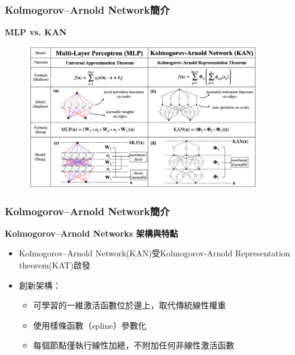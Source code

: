 \documentclass{beamer}
\begin{document}
\begin{frame}
    \frametitle{Kolmogorov–Arnold Network簡介}
    \centering
    \textbf{MLP vs. KAN}\\
    \begin{figure}               %
    \centering                 %
    \includegraphics[width=0.9\textwidth,keepaspectratio]{figures/MLP_vs_KAN.png}
    \end{figure}
\end{frame}

\begin{frame}
    \frametitle{Kolmogorov–Arnold Network簡介}
    \centering
    \textbf{Kolmogorov–Arnold Networks 架構與特點}\\[0.5cm]
    \begin{itemize}
        \item Kolmogorov–Arnold Network(KAN)受Kolmogorov-Arnold Representation theorem(KAT)啟發
        \item 創新架構：
        \begin{itemize}
            \item 可學習的一維激活函數位於邊上，取代傳統線性權重
            \item 使用樣條函數（spline）參數化
            \item 每個節點僅執行線性加總，不附加任何非線性激活函數
        \end{itemize}
    \end{itemize}
\end{frame}
\end{document}
